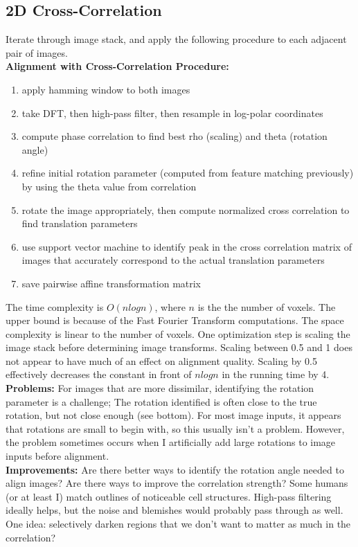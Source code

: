 \documentclass{article}
\begin{document}
\subsection{2D Cross-Correlation}
Iterate through image stack, and apply the following procedure to each adjacent pair of images. \\
\textbf{Alignment with Cross-Correlation Procedure:}
\begin{enumerate}
\item apply hamming window to both images
\item take DFT, then high-pass filter, then resample in log-polar coordinates
\item compute phase correlation to find best rho (scaling) and theta (rotation angle)
\item refine initial rotation parameter (computed from feature matching previously) by using the theta value from correlation
\item rotate the image appropriately, then compute normalized cross correlation to find translation parameters
\item use support vector machine to identify peak in the cross correlation matrix of images that accurately correspond to the actual translation parameters
\item save pairwise affine transformation matrix
\end{enumerate}

The time complexity is $O(nlogn)$, where $n$ is the the number of voxels. The upper bound is because of the Fast Fourier Transform computations. The space complexity is linear to the number of voxels. One optimization step is scaling the image stack before determining image transforms. Scaling between 0.5 and 1 does not appear to have much of an effect on alignment quality. Scaling by 0.5 effectively decreases the constant in front of $nlogn$ in the running time by 4. \\

\textbf{Problems:} For images that are more dissimilar, identifying the rotation parameter is a challenge; The rotation identified is often close to the true rotation, but not close enough (see bottom). For most image inputs, it appears that rotations are small to begin with, so this usually isn't a problem. However, the problem sometimes occurs when I artificially add large rotations to image inputs before alignment.\\
\textbf{Improvements:} Are there better ways to identify the rotation angle needed to align images? Are there ways to improve the correlation strength? Some humans (or at least I) match outlines of noticeable cell structures. High-pass filtering ideally helps, but the noise and blemishes would probably pass through as well. One idea: selectively darken regions that we don't want to matter as much in the correlation? \\
\end{document}
